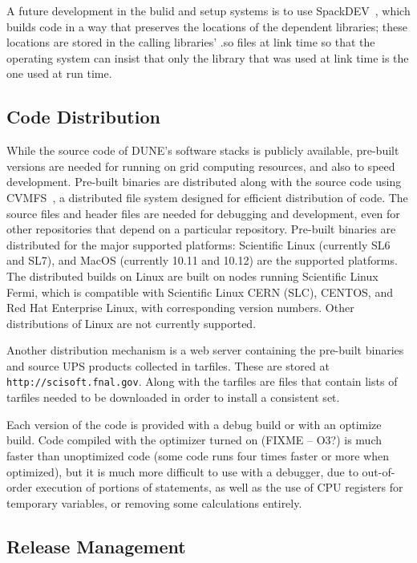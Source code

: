 A future development in the bulid and setup systems is to use SpackDEV~\cite{SpackDEV}, which builds code in
a way that preserves the locations of the dependent libraries; these locations are stored in the calling
libraries' .so files at link time so that the operating system can insist that only the library that was used
at link time is the one used at run time.

\subsection{Code Distribution}

While the source code of DUNE's software stacks is publicly available, pre-built versions are needed
for running on grid computing resources, and also to speed development.  Pre-built binaries are distributed
along with the source code using CVMFS~\cite{CVMFS}, a distributed file system designed for efficient
distribution of code.  The source files and header files are needed for debugging and development,
even for other repositories that depend on a particular repository.  Pre-built binaries are distributed
for the major supported platforms:  Scientific Linux (currently SL6 and SL7), and MacOS (currently 10.11
and 10.12) are the supported platforms.  The distributed builds on Linux are built on nodes running
Scientific Linux Fermi, which is compatible with Scientific Linux CERN (SLC), CENTOS, and Red Hat Enterprise
Linux, with corresponding version numbers.  Other distributions of Linux are not currently supported.

Another distribution mechanism is a web server containing the pre-built binaries and source UPS products
collected in tarfiles.  These are stored at {\tt http://scisoft.fnal.gov}.  Along with the tarfiles are
files that contain lists of tarfiles needed to be downloaded in order to install a consistent set.

Each version of the code is provided with a debug build or with an optimize build.  Code compiled with
the optimizer turned on (FIXME -- O3?) is much faster than unoptimized code (some code runs four times faster
or more when optimized), but it is much more difficult to use with a debugger, due to out-of-order execution
of portions of statements, as well as the use of CPU registers for temporary variables, or removing some
calculations entirely.

\subsection{Release Management}

